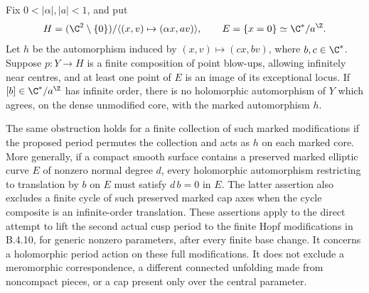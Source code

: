 \begin{proposition}\label{push:src:B.4.13}
Fix $0<|\alpha|,|a|<1$, and put
\[
 H=(\C^2\setminus\{0\})/
       \langle(x,v)\mapsto(\alpha x,av)\rangle,
       \qquad E=\{x=0\}\simeq\C^*/a^\Z.
\]
Let $h$ be the automorphism induced by
$(x,v)\mapsto(c x,bv)$, where $b,c\in\C^*$.
Suppose $p:Y\to H$ is a finite composition of point blow-ups,
allowing infinitely near centres, and at least one point of $E$
is an image of its exceptional locus. If $[b]\in\C^*/a^\Z$ has
infinite order, there is no holomorphic automorphism of $Y$
which agrees, on the dense unmodified core, with the marked
automorphism $h$.

The same obstruction holds for a finite collection of such marked
modifications if the proposed period permutes the collection and
acts as $h$ on each marked core.
More generally, if a compact smooth surface contains a preserved
marked elliptic curve $E$ of nonzero normal degree $d$, every
holomorphic automorphism restricting to translation by $b$ on $E$
must satisfy $d\,b=0$ in $E$.
The latter assertion also excludes a finite cycle of such preserved
marked cap axes when the cycle composite is an infinite-order
translation. These assertions apply to the direct attempt
to lift the second actual cusp period to the finite Hopf
modifications in B.4.10, for generic nonzero parameters, after every
finite base change. It concerns a holomorphic period action on
these full modifications. It does not exclude a meromorphic
correspondence, a different connected unfolding made from
noncompact pieces, or a cap present only over the central parameter.
\end{proposition}
